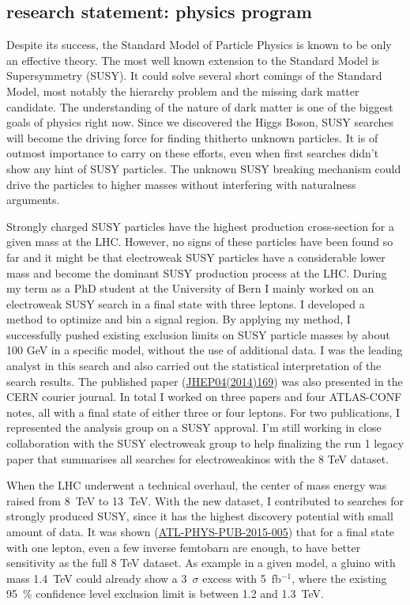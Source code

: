 \documentclass[]{cv} %
\begin{document}
\begin{statement}

\section{research statement: physics program}

Despite its success, the Standard Model of Particle Physics is known to be only
an effective theory. The most well known extension to the Standard Model is
Supersymmetry (SUSY). It could solve several short comings of the Standard
Model, most notably the hierarchy problem and the missing dark matter candidate.
The understanding of the nature of dark matter is one of the biggest goals of
physics right now. Since we discovered the Higgs Boson, SUSY searches will
become the driving force for finding thitherto unknown particles. It is of
outmost importance to carry on these efforts, even when first searches didn't
show any hint of SUSY particles. The unknown SUSY breaking mechanism could drive
the particles to higher masses without interfering with naturalness arguments.

Strongly charged SUSY particles have the highest production cross-section for a
given mass at the LHC. However, no signs of these particles have been found so
far and it might be that electroweak SUSY particles have a considerable lower
mass and become the dominant SUSY production process at the LHC. During my term
as a PhD student at the University of Bern I mainly worked on an electroweak
SUSY search in a final state with three leptons. I developed a method to
optimize and bin a signal region. By applying my method, I successfully pushed
existing exclusion limits on SUSY particle masses by about 100 GeV in a specific
model, without the use of additional data. I was the leading analyst in this
search and also carried out the statistical interpretation of the search
results. The published paper
(\href{http://dx.doi.org/10.1007/JHEP04(2014)169}{JHEP04(2014)169}) was also
presented in the CERN courier journal. In total I worked on three papers and
four ATLAS-CONF notes, all with a final state of either three or four leptons.
For two publications, I represented the analysis group on a SUSY approval. I'm
still working in close collaboration with the SUSY electroweak group to help
finalizing the run 1 legacy paper that summarises all searches for
electroweakinos with the 8 TeV dataset.

When the LHC underwent a technical overhaul, the center of mass energy was
raised from 8~TeV to 13~TeV. With the new dataset, I contributed to searches for
strongly produced SUSY, since it has the highest discovery potential with small
amount of data. It was shown
(\href{https://cds.cern.ch/record/2002608/}{ATL-PHYS-PUB-2015-005}) that for a
final state with one lepton, even a few inverse femtobarn are enough, to have
better sensitivity as the full 8 TeV dataset. As example in a given model, a
gluino with mass 1.4~TeV could already show a 3~$\sigma$ excess with
5~fb$^{-1}$, where the existing 95~\% confidence level exclusion limit is
between 1.2 and 1.3~TeV.


\end{statement}
\end{document}
